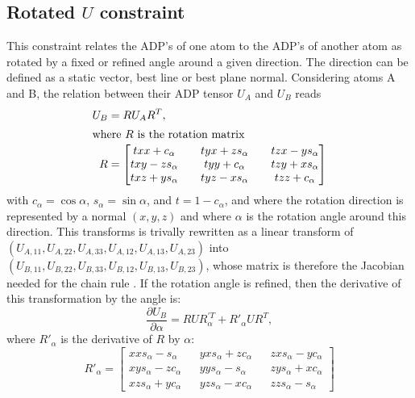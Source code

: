 \documentclass[pdf]{iucr}
\newcommand{\partialder}[2]{\frac{\partial #1}{\partial #2}}
\begin{document}
\subsection{Rotated $U$ constraint}
This constraint relates the ADP's of one atom to the ADP's of another atom as rotated by a fixed or refined angle around a given direction. The direction can be defined as a static vector, best line or best plane normal. Considering atoms A and B, the relation between their ADP tensor $U_A$ and $U_B$ reads
\begin{align}
U_{B} &= RU_{A}R^{T}, \\
\shortintertext{where $R$ is the rotation matrix}
R &=
  \begin{bmatrix} 
    txx + c_\alpha && tyx + zs_\alpha && tzx - ys_\alpha \\
    txy - zs_\alpha && tyy + c_\alpha && tzy + xs_\alpha \\
    txz + ys_\alpha && tyz - xs_\alpha && tzz + c_\alpha \\
  \end{bmatrix}
  \label{eqn:rotmat}
\end{align}
with $c_\alpha=\cos\alpha$, $s_\alpha=\sin\alpha$, and $t=1-c_\alpha$, and where the rotation direction is represented by a normal $(x,y,z)$ and where $\alpha$ is the rotation angle around this direction. This transforms is trivally rewritten as a linear transform of $(U_{A,11}, U_{A,22}, U_{A,33}, U_{A,12}, U_{A,13}, U_{A,23})$ into $(U_{B,11}, U_{B,22}, U_{B,33}, U_{B,12}, U_{B,13}, U_{B,23})$, whose matrix is therefore the Jacobian needed for the chain rule . If the rotation angle is refined, then the derivative of this transformation by the angle is:
\begin{equation}
\partialder{U_{B}}{\alpha} = RUR_\alpha^{\prime T} + R'_\alpha U R^{T},
\end{equation}
where $R'_\alpha$ is the derivative of $R$ by $\alpha$:
\begin{equation}
R'_\alpha = 
  \begin{bmatrix} 
    xx s_\alpha -  s_\alpha && yx s_\alpha + z c_\alpha && zx s_\alpha - y c_\alpha \\
    xy s_\alpha - z c_\alpha && yy s_\alpha -  s_\alpha && zy s_\alpha + x c_\alpha \\
    xz s_\alpha + y c_\alpha && yz s_\alpha - x c_\alpha && zz s_\alpha - s_\alpha
  \end{bmatrix}
  \label{eqn:rotmatdev}
\end{equation}
\end{document}

